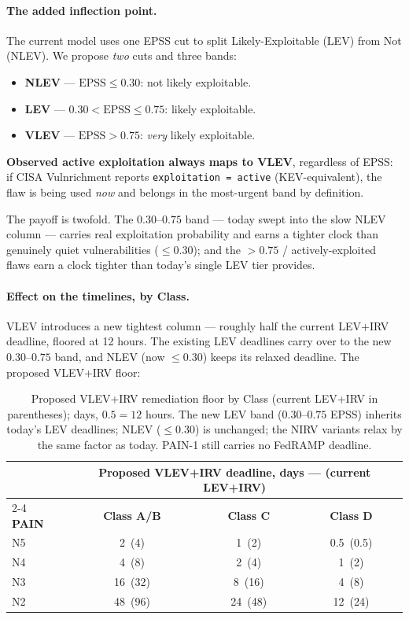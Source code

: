 \documentclass[11pt]{article}
\newcommand{\code}[1]{\texttt{#1}}
\begin{document}
\paragraph{The added inflection point.} The current model uses one EPSS cut to split
Likely-Exploitable (LEV) from Not (NLEV). We propose \emph{two} cuts and three bands:
\begin{itemize}[leftmargin=1.5em,nosep,topsep=3pt]
\item \textbf{NLEV} --- $\text{EPSS} \le 0.30$: not likely exploitable.
\item \textbf{LEV} --- $0.30 < \text{EPSS} \le 0.75$: likely exploitable.
\item \textbf{VLEV} --- $\text{EPSS} > 0.75$: \emph{very} likely exploitable.
\end{itemize}
\textbf{Observed active exploitation always maps to VLEV}, regardless of EPSS: if
CISA Vulnrichment reports \code{exploitation = active} (KEV-equivalent), the flaw is
being used \emph{now} and belongs in the most-urgent band by definition.

The payoff is twofold. The $0.30$--$0.75$ band --- today swept into the slow NLEV
column --- carries real exploitation probability and earns a tighter clock than
genuinely quiet vulnerabilities ($\le 0.30$); and the $>0.75$ / actively-exploited
flaws earn a clock tighter than today's single LEV tier provides.

\paragraph{Effect on the timelines, by Class.} VLEV introduces a new tightest column
--- roughly half the current LEV+IRV deadline, floored at 12 hours. The existing LEV
deadlines carry over to the new $0.30$--$0.75$ band, and NLEV (now $\le 0.30$) keeps
its relaxed deadline. The proposed VLEV+IRV floor:

\begin{table}[H]
\centering
\footnotesize
\renewcommand{\arraystretch}{1.2}
\begin{tabular}{l ccc}
\toprule
& \multicolumn{3}{c}{\textbf{Proposed VLEV+IRV deadline, days --- (current LEV+IRV)}} \\
\cmidrule(lr){2-4}
\textbf{PAIN} & \textbf{Class A/B} & \textbf{Class C} & \textbf{Class D} \\
\midrule
N5 & 2 \,(4)   & 1 \,(2)   & 0.5 \,(0.5) \\
N4 & 4 \,(8)   & 2 \,(4)   & 1 \,(2) \\
N3 & 16 \,(32) & 8 \,(16)  & 4 \,(8) \\
N2 & 48 \,(96) & 24 \,(48) & 12 \,(24) \\
\bottomrule
\end{tabular}
\caption{Proposed VLEV+IRV remediation floor by Class (current LEV+IRV in
parentheses); days, $0.5 = 12$ hours. The new LEV band ($0.30$--$0.75$ EPSS) inherits
today's LEV deadlines; NLEV ($\le 0.30$) is unchanged; the NIRV variants relax by the
same factor as today. PAIN-1 still carries no FedRAMP deadline.}
\end{table}
\end{document}
